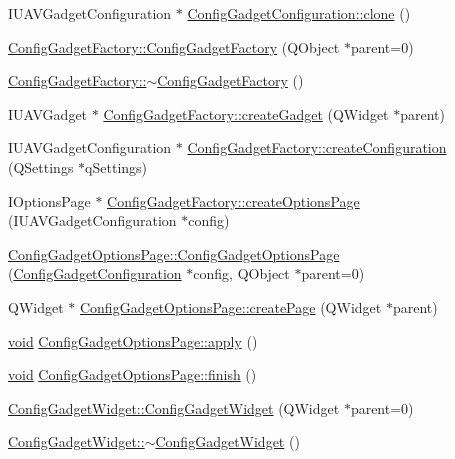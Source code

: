 \begin{DoxyCompactItemize}
\-I\-U\-A\-V\-Gadget\-Configuration $\ast$ \hyperlink{group___config_plugin_gac237bebed60ca183ae60b2b4598acc47}{\-Config\-Gadget\-Configuration\-::clone} ()
\item 
\hyperlink{group___config_plugin_ga7785d39aeb34203184e554b3f3efda71}{\-Config\-Gadget\-Factory\-::\-Config\-Gadget\-Factory} (\-Q\-Object $\ast$parent=0)
\item 
\hyperlink{group___config_plugin_gad9021aa0495e8db3dbaf86f04d7ae1e1}{\-Config\-Gadget\-Factory\-::$\sim$\-Config\-Gadget\-Factory} ()
\item 
\-I\-U\-A\-V\-Gadget $\ast$ \hyperlink{group___config_plugin_ga0a27d1d7799dadf3e68617090af3054c}{\-Config\-Gadget\-Factory\-::create\-Gadget} (\-Q\-Widget $\ast$parent)
\item 
\-I\-U\-A\-V\-Gadget\-Configuration $\ast$ \hyperlink{group___config_plugin_gad4b30018cb53b866caf602b7f5409b0c}{\-Config\-Gadget\-Factory\-::create\-Configuration} (\-Q\-Settings $\ast$q\-Settings)
\item 
\-I\-Options\-Page $\ast$ \hyperlink{group___config_plugin_ga371219573cd1b14bbc5d533577281f7b}{\-Config\-Gadget\-Factory\-::create\-Options\-Page} (\-I\-U\-A\-V\-Gadget\-Configuration $\ast$config)
\item 
\hyperlink{group___config_plugin_ga2d5af20878472037582f441a56bca28c}{\-Config\-Gadget\-Options\-Page\-::\-Config\-Gadget\-Options\-Page} (\hyperlink{class_config_gadget_configuration}{\-Config\-Gadget\-Configuration} $\ast$config, \-Q\-Object $\ast$parent=0)
\item 
\-Q\-Widget $\ast$ \hyperlink{group___config_plugin_ga28c537e8f2468debe3c869bda53fd6c9}{\-Config\-Gadget\-Options\-Page\-::create\-Page} (\-Q\-Widget $\ast$parent)
\item 
\hyperlink{group___u_a_v_objects_plugin_ga444cf2ff3f0ecbe028adce838d373f5c}{void} \hyperlink{group___config_plugin_gab4d162de9174c38e3567e117a5b5c70f}{\-Config\-Gadget\-Options\-Page\-::apply} ()
\item 
\hyperlink{group___u_a_v_objects_plugin_ga444cf2ff3f0ecbe028adce838d373f5c}{void} \hyperlink{group___config_plugin_gae12bea8fac88d0fd0b9d3c95b0e62472}{\-Config\-Gadget\-Options\-Page\-::finish} ()
\item 
\hyperlink{group___config_plugin_gafc45c197f2917c39166b7d228d592784}{\-Config\-Gadget\-Widget\-::\-Config\-Gadget\-Widget} (\-Q\-Widget $\ast$parent=0)
\item 
\hyperlink{group___config_plugin_gaeafab35f30d35ed548cda276953b8ad5}{\-Config\-Gadget\-Widget\-::$\sim$\-Config\-Gadget\-Widget} ()

\end{DoxyCompactItemize}

